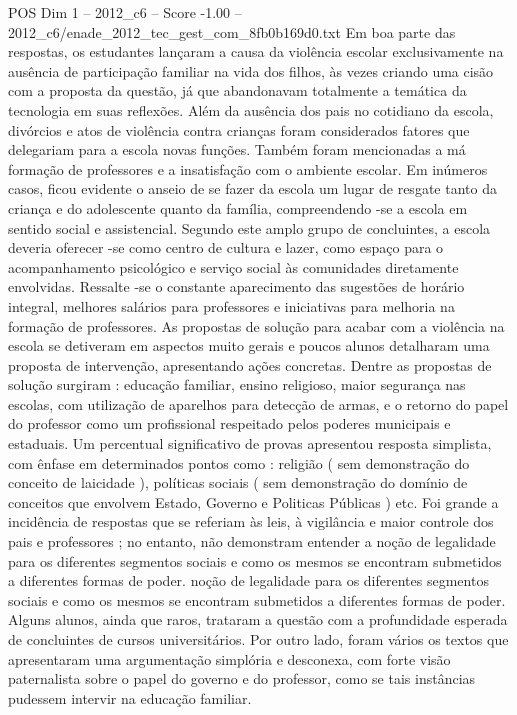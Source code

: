\begin{textsample}{POS Dim 1 – 2012\_c6 – Score -1.00 – 2012\_c6/enade\_2012\_tec\_gest\_com\_8fb0b169d0.txt}
Em boa parte das respostas, os estudantes lançaram a causa da violência escolar exclusivamente na ausência de participação familiar na vida dos filhos, às vezes criando uma cisão com a proposta da questão, já que abandonavam totalmente a temática da tecnologia em suas reflexões.
Além da ausência dos pais no cotidiano da escola, divórcios e atos de violência contra crianças foram considerados fatores que delegariam para a escola novas funções.
Também foram mencionadas a má formação de professores e a insatisfação com o ambiente escolar.
Em inúmeros casos, ficou evidente o anseio de se fazer da escola um lugar de resgate tanto da criança e do adolescente quanto da família, compreendendo -se a escola em sentido social e assistencial.
Segundo este amplo grupo de concluintes, a escola deveria oferecer -se como centro de cultura e lazer, como espaço para o acompanhamento psicológico e serviço social às comunidades diretamente envolvidas.
Ressalte -se o constante aparecimento das sugestões de horário integral, melhores salários para professores e iniciativas para melhoria na formação de professores.
As propostas de solução para acabar com a violência na escola se detiveram em aspectos muito gerais e poucos alunos detalharam uma proposta de intervenção, apresentando ações concretas.
Dentre as propostas de solução surgiram : educação familiar, ensino religioso, maior segurança nas escolas, com utilização de aparelhos para detecção de armas, e o retorno do papel do professor como um profissional respeitado pelos poderes municipais e estaduais.
Um percentual significativo de provas apresentou resposta simplista, com ênfase em determinados pontos como : religião ( sem demonstração do conceito de laicidade ), políticas sociais ( sem demonstração do domínio de conceitos que envolvem Estado, Governo e Politicas Públicas ) etc.
Foi grande a incidência de respostas que se referiam às leis, à vigilância e maior controle dos pais e professores ; no entanto, não demonstram entender a noção de legalidade para os diferentes segmentos sociais e como os mesmos se encontram submetidos a diferentes formas de poder. noção de legalidade para os diferentes segmentos sociais e como os mesmos se encontram submetidos a diferentes formas de poder.
Alguns alunos, ainda que raros, trataram a questão com a profundidade esperada de concluintes de cursos universitários.
Por outro lado, foram vários os textos que apresentaram uma argumentação simplória e desconexa, com forte visão paternalista sobre o papel do governo e do professor, como se tais instâncias pudessem intervir na educação familiar.

\end{textsample}
